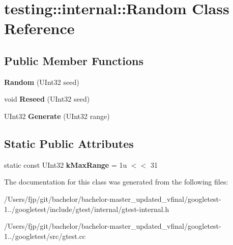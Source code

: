 \hypertarget{classtesting_1_1internal_1_1_random}{}\section{testing\+:\+:internal\+:\+:Random Class Reference}
\label{classtesting_1_1internal_1_1_random}
\subsection*{Public Member Functions}
\begin{DoxyCompactItemize}
\item 
\mbox{\label{classtesting_1_1internal_1_1_random_a6e112be5e7cce00551f6383025f69460}} 
{\bfseries Random} (U\+Int32 seed)
\item 
\mbox{\label{classtesting_1_1internal_1_1_random_adf2f24199318a46f885c78f50d89a69e}} 
void {\bfseries Reseed} (U\+Int32 seed)
\item 
\mbox{\label{classtesting_1_1internal_1_1_random_a9315b7fb621cbcfdf92ed4b5e584c0db}} 
U\+Int32 {\bfseries Generate} (U\+Int32 range)
\end{DoxyCompactItemize}
\subsection*{Static Public Attributes}
\begin{DoxyCompactItemize}
\item 
\mbox{\label{classtesting_1_1internal_1_1_random_a36d72dd7063d0b5338f229e75382fdd2}} 
static const U\+Int32 {\bfseries k\+Max\+Range} = 1u $<$$<$ 31
\end{DoxyCompactItemize}


The documentation for this class was generated from the following files\+:\begin{DoxyCompactItemize}
\item 
/\+Users/fjp/git/bachelor/bachelor-\/master\+\_\+updated\+\_\+vfinal/googletest-\/1../googletest/include/gtest/internal/gtest-\/internal.\+h\item 
/\+Users/fjp/git/bachelor/bachelor-\/master\+\_\+updated\+\_\+vfinal/googletest-\/1../googletest/src/gtest.\+cc\end{DoxyCompactItemize}
